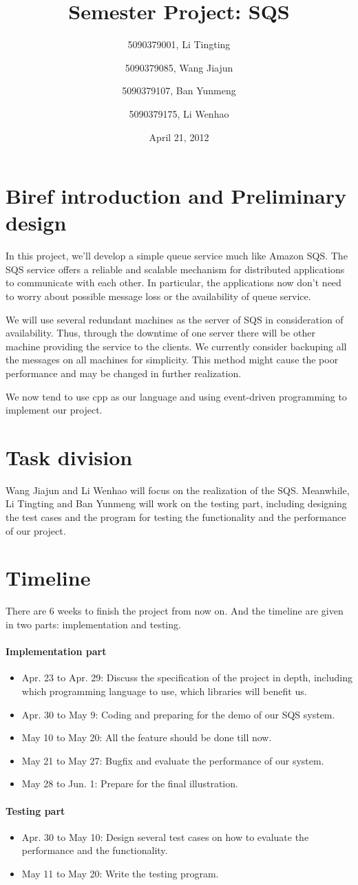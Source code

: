 \documentclass[a4paper,12pt]{article}
\title{Semester Project: SQS}
\author{5090379001, Li Tingting\and 
        5090379085, Wang Jiajun\and 
        5090379107, Ban Yunmeng\and 
        5090379175, Li Wenhao}
\date{April 21, 2012}
\begin{document}
\maketitle
\section{Biref introduction and Preliminary design}
In this project, we'll develop a simple queue service much like Amazon SQS. The SQS service offers a reliable and scalable mechanism for distributed applications to communicate with each other. In particular, the applications now don't need to worry about possible message loss or the availability of queue service.

We will use several redundant machines as the server of SQS in consideration of availability. Thus, through the downtime of one server there will be other machine providing the service to the clients. We currently consider backuping all the messages on all machines for simplicity. This method might cause the poor performance and may be changed in further realization.

We now tend to use cpp as our language and using event-driven programming to implement our project.
\section{Task division}
Wang Jiajun and Li Wenhao will focus on the realization of the SQS. Meanwhile, Li Tingting and Ban Yunmeng will work on the testing part, including designing the test cases and the program for testing the functionality and the performance of our project.
\section{Timeline}
There are 6 weeks to finish the project from now on. And the timeline are given in two parts: implementation and testing.
\paragraph{Implementation part}
\begin{itemize}
 \item Apr. 23 to Apr. 29: Discuss the specification of the project in depth, including which programming language to use, which libraries will benefit us.
 \item Apr. 30 to May 9: Coding and preparing for the demo of our SQS system.
 \item May 10 to May 20: All the feature should be done till now.
 \item May 21 to May 27: Bugfix and evaluate the performance of our system.
 \item May 28 to Jun. 1: Prepare for the final illustration.
\end{itemize}
\paragraph{Testing part}
\begin{itemize}
 \item Apr. 30 to May 10: Design several test cases on how to evaluate the performance and the functionality.
 \item May 11 to May 20: Write the testing program.
\end{itemize}
\end{document}
